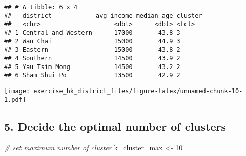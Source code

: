 \documentclass[]{article}
\newenvironment{Shaded}{\begin{snugshade}}{\end{snugshade}}
\newcommand{\CommentTok}[1]{\textcolor[rgb]{0.56,0.35,0.01}{\textit{#1}}}
\newcommand{\ControlFlowTok}[1]{\textcolor[rgb]{0.13,0.29,0.53}{\textbf{#1}}}
\newcommand{\DataTypeTok}[1]{\textcolor[rgb]{0.13,0.29,0.53}{#1}}
\newcommand{\DecValTok}[1]{\textcolor[rgb]{0.00,0.00,0.81}{#1}}
\newcommand{\KeywordTok}[1]{\textcolor[rgb]{0.13,0.29,0.53}{\textbf{#1}}}
\newcommand{\NormalTok}[1]{#1}
\newcommand{\OperatorTok}[1]{\textcolor[rgb]{0.81,0.36,0.00}{\textbf{#1}}}
\newcommand{\StringTok}[1]{\textcolor[rgb]{0.31,0.60,0.02}{#1}}
\begin{document}
\begin{verbatim}
## # A tibble: 6 x 4
##   district            avg_income median_age cluster
##   <chr>                    <dbl>      <dbl> <fct>  
## 1 Central and Western      17000       43.8 3      
## 2 Wan Chai                 15000       44.9 3      
## 3 Eastern                  15000       43.8 2      
## 4 Southern                 14500       43.9 2      
## 5 Yau Tsim Mong            14500       43.2 2      
## 6 Sham Shui Po             13500       42.9 2
\end{verbatim}

\begin{Shaded}
\end{Shaded}

\texttt{[image: exercise\_hk\_district\_files/figure-latex/unnamed-chunk-10-1.pdf]}

\hypertarget{decide-the-optimal-number-of-clusters}{%
\subsection{5. Decide the optimal number of
clusters}\label{decide-the-optimal-number-of-clusters}}

\begin{Shaded}
\begin{Highlighting}[]
\CommentTok{# set maximum number of cluster}
\NormalTok{k_cluster_max <-}\StringTok{ }\DecValTok{10}
\end{Highlighting}
\end{Shaded}

\begin{Shaded}
\end{Shaded}
\end{document}
